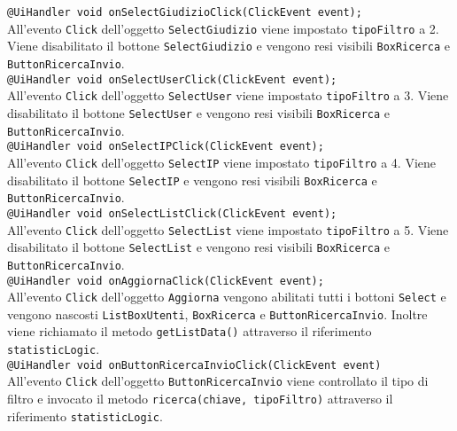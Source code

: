 {\begin{sloppypar}
{\begin{itemize}
\begin{itemize}
					\texttt{@UiHandler void onSelectGiudizioClick(ClickEvent event);}\\
					All'evento \texttt{Click} dell'oggetto \texttt{SelectGiudizio} viene impostato \texttt{tipoFiltro} a 2. Viene disabilitato il bottone \texttt{SelectGiudizio} e vengono resi visibili \texttt{BoxRicerca} e \texttt{ButtonRicercaInvio}.\\
					
					\texttt{@UiHandler void onSelectUserClick(ClickEvent event);}\\
					All'evento \texttt{Click} dell'oggetto \texttt{SelectUser} viene impostato \texttt{tipoFiltro} a 3. Viene disabilitato il bottone \texttt{SelectUser} e vengono resi visibili \texttt{BoxRicerca} e \texttt{ButtonRicercaInvio}.\\
					
					\texttt{@UiHandler void onSelectIPClick(ClickEvent event);}\\
					All'evento \texttt{Click} dell'oggetto \texttt{SelectIP} viene impostato \texttt{tipoFiltro} a 4. Viene disabilitato il bottone \texttt{SelectIP} e vengono resi visibili \texttt{BoxRicerca} e \texttt{ButtonRicercaInvio}.\\
					
					\texttt{@UiHandler void onSelectListClick(ClickEvent event);}\\
					All'evento \texttt{Click} dell'oggetto \texttt{SelectList} viene impostato \texttt{tipoFiltro} a 5. Viene disabilitato il bottone \texttt{SelectList} e vengono resi visibili \texttt{BoxRicerca} e \texttt{ButtonRicercaInvio}.\\
					
					\texttt{@UiHandler void onAggiornaClick(ClickEvent event);}\\
					All'evento \texttt{Click} dell'oggetto \texttt{Aggiorna} vengono abilitati tutti i bottoni \texttt{Select} e vengono nascosti \texttt{ListBoxUtenti}, \texttt{BoxRicerca} e \texttt{ButtonRicercaInvio}. Inoltre viene richiamato il metodo \texttt{getListData()} attraverso il riferimento \texttt{statisticLogic}.\\
					
					\texttt{@UiHandler void onButtonRicercaInvioClick(ClickEvent event)}\\
					All’evento \texttt{Click} dell’oggetto \texttt{ButtonRicercaInvio} viene controllato il tipo di filtro e invocato il metodo \texttt{ricerca(chiave, tipoFiltro)} attraverso il riferimento \texttt{statisticLogic}.\\
			\end{itemize}
		

\end{itemize}}
\end{sloppypar}}
